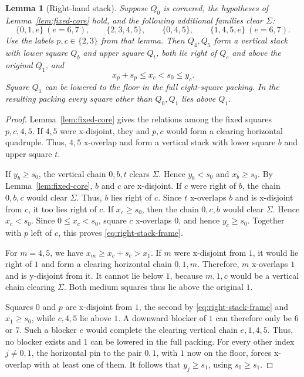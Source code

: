 \documentclass[12pt]{amsart}
\newtheorem{lemma}[theorem]{Lemma}
\theoremstyle{definition}
\theoremstyle{remark}
\numberwithin{equation}{section}
\numberwithin{figure}{section}
\numberwithin{table}{section}
\begin{document}
\begin{lemma}[Right-hand stack]\label{lem:right-stack}
Suppose $Q_0$ is cornered, the hypotheses of Lemma~\ref{lem:fixed-core}
hold, and the following additional families clear $\Sigma$:
\[
\{0,1,e\}\ (e=6,7),\qquad \{2,3,4,5\},\qquad
\{0,4,5\},\qquad \{1,4,5,e\}\ (e=6,7).
\]
Use the labels $p,c\in\{2,3\}$ from that lemma. Then $Q_4,Q_5$ form a
vertical stack with lower square $Q_b$ and upper square $Q_t$, both lie right
of $Q_c$ and above the original $Q_1$, and
\begin{equation}\label{eq:right-stack-frame}
x_p+s_p\le x_c<s_0\le y_c.
\end{equation}
Square $Q_1$ can be lowered to the floor in the full eight-square packing.
In the resulting packing every square other than $Q_0,Q_1$ lies above $Q_1$.
\end{lemma}
\begin{proof}
Lemma~\ref{lem:fixed-core} gives the relations among the fixed squares
$p,c,4,5$. If $4,5$ were x-disjoint, they and $p,c$ would form a clearing horizontal
quadruple. Thus, $4,5$ x-overlap and form a vertical stack with lower square $b$ and
upper square $t$.

If $y_b\ge s_0$, the vertical chain $0,b,t$ clears $\Sigma$. Hence $y_b<s_0$ and
$x_b\ge s_0$. By Lemma~\ref{lem:fixed-core}, $b$ and $c$ are x-disjoint. If $c$ were
right of $b$, the chain $0,b,c$ would clear $\Sigma$. Thus, $b$ lies right of $c$.
Since $t$ x-overlaps $b$ and is x-disjoint from $c$, it too
lies right of $c$. If $x_c\ge s_0$, then the chain $0,c,b$ would clear $\Sigma$. Hence
$x_c<s_0$. Since $0\le x_c<s_0$, square $c$ x-overlaps $0$,
and hence $y_c\ge s_0$.
Together with $p$ left of $c$, this proves \eqref{eq:right-stack-frame}.

For $m=4,5$, we have $x_m\ge x_c+s_c>x_1$. If $m$ were x-disjoint from
$1$, it would lie right of $1$ and form a clearing horizontal chain
$0,1,m$. Therefore, $m$ x-overlaps $1$ and is y-disjoint from it.
It cannot lie below $1$, because $m,1,c$ would be a vertical chain clearing $\Sigma$. Both
medium squares thus lie above the original $1$.

Squares $0$ and $p$ are x-disjoint from $1$, the second by
\eqref{eq:right-stack-frame} and $x_1\ge s_0$, while $c,4,5$ lie above $1$.
A downward blocker of $1$ can therefore only be $6$ or $7$. Such a blocker $e$
would complete the clearing vertical chain $e,1,4,5$. Thus, no blocker
exists and $1$ can be lowered in the full packing. For every
other index $j\ne0,1$, the horizontal pin to the pair $0,1$, with $1$ now on the floor,
forces x-overlap with at least one of them. It follows that
$y_j\ge s_1$, using $s_0\ge s_1$.
\end{proof}
\end{document}
